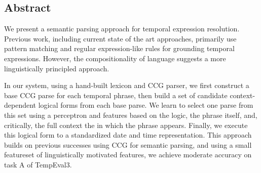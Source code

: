 \subsection*{Abstract}
We present a semantic parsing approach for temporal expression resolution. 
Previous work, including current state of the art approaches, primarily use pattern matching and regular expression-like rules for grounding temporal expressions. However, the compositionality of language suggests a more linguistically principled approach. 

In our system, using a hand-built lexicon and CCG parser, we first construct a 
base CCG parse for each temporal phrase, then build a set of candidate
context-dependent logical forms from each base parse. We learn to select one parse from this set using a perceptron and features based on the logic, the phrase itself, and, critically, the full context the in which the phrase appears. Finally, we execute this logical form to a standardized date and time representation. This approach builds on previous successes using CCG for semantic parsing, and using a small featureset of linguistically motivated features, we achieve moderate accuracy on task A of TempEval3.
